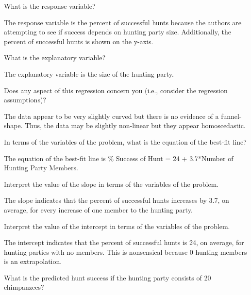 \documentclass[10pt,openany]{book}\usepackage[]{graphicx}\usepackage[]{color}
\begin{document}
\begin{QAlist}
  \item What is the response variable?
  \begin{QAlist}
    \item The response variable is the percent of successful hunts because the authors are attempting to see if success depends on hunting party size. Additionally, the percent of successful hunts is shown on the y-axis.
  \end{QAlist}
  \item What is the explanatory variable?
  \begin{QAlist}
    \item The explanatory variable is the size of the hunting party.
  \end{QAlist}
  \item Does any aspect of this regression concern you (i.e., consider the regression assumptions)?
  \begin{QAlist}
    \item The data appear to be very slightly curved but there is no evidence of a funnel-shape. Thus, the data may be slightly non-linear but they appear homoscedastic.
  \end{QAlist}
  \item In terms of the variables of the problem, what is the equation of the best-fit line?
  \begin{QAlist}
    \item The equation of the best-fit line is \% Success of Hunt = 24 + 3.7*Number of Hunting Party Members.
  \end{QAlist}
  \item Interpret the value of the slope in terms of the variables of the problem.
  \begin{QAlist}
    \item The slope indicates that the percent of successful hunts increases by 3.7, on average, for every increase of one member to the hunting party.
  \end{QAlist}
  \item Interpret the value of the intercept in terms of the variables of the problem.
  \begin{QAlist}
    \item The intercept indicates that the percent of successful hunts is 24, on average, for hunting parties with no members. This is nonsensical because 0 hunting members is an extrapolation.
  \end{QAlist}
  \item What is the predicted hunt success if the hunting party consists of 20 chimpanzees?

\end{QAlist}
\end{document}
